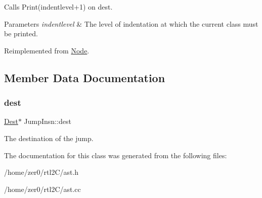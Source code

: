 Calls Print(indentlevel+1) on dest. 
\begin{DoxyParams}{Parameters}
{\em indentlevel} & The level of indentation at which the current class must be printed. \\
\hline
\end{DoxyParams}


Reimplemented from \hyperlink{class_node_a3e67ec8d22182b721717af14fe0c3000}{Node}.



\subsection{Member Data Documentation}
\mbox{\label{class_jump_insn_af5f460b6bc60667acd1776acb864b602}} 
\subsubsection{\texorpdfstring{dest}{dest}}
{\footnotesize\ttfamily \hyperlink{class_dest}{Dest}$\ast$ Jump\+Insn\+::dest\hspace{0.3cm}{\ttfamily [protected]}}

The destination of the jump. 

The documentation for this class was generated from the following files\+:\begin{DoxyCompactItemize}
\item 
/home/zer0/rtl2\+C/ast.\+h\item 
/home/zer0/rtl2\+C/ast.\+cc\end{DoxyCompactItemize}
